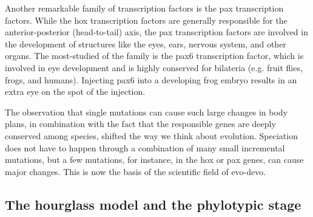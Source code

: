 Another remarkable family of transcription factors is the pax transcription factors. While the hox transcription factors are generally responsible for the anterior-posterior (head-to-tail) axis, the pax transcription factors are involved in the development of structures like the eyes, ears, nervous system, and other organs. The most-studied of the family is the pax6 transcription factor, which is involved in eye development and is highly conserved for bilateria (e.g. fruit flies, frogs, and humans). Injecting pax6 into a developing frog embryo results in an extra eye on the spot of the injection\cite{Chow1999}.

The observation that single mutations can cause such large changes in body plans, in combination with the fact that the responsible genes are deeply conserved among species, shifted the way we think about evolution. Speciation does not have to happen through a combination of many small incremental mutations, but a few mutations, for instance, in the hox or pax genes, can cause major changes. This is now the basis of the scientific field of evo-devo.

\subsection{The hourglass model and the phylotypic stage}

